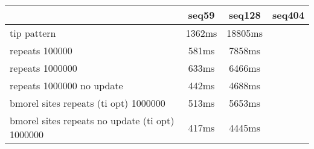 \begin{tabular}{|l|c|c|c|}
\hline
 & seq59 & seq128 & seq404  \\
\hline
tip pattern & 1362ms & 18805ms\\
\hline
repeats 100000 & 581ms & 7858ms\\
\hline
repeats 1000000 & 633ms & 6466ms\\
\hline
repeats 1000000 no update & 442ms & 4688ms\\
\hline
bmorel sites repeats (ti opt) 1000000 & 513ms & 5653ms\\
\hline
bmorel sites repeats no update (ti opt) 1000000 & 417ms & 4445ms\\
\hline
\end{tabular}
